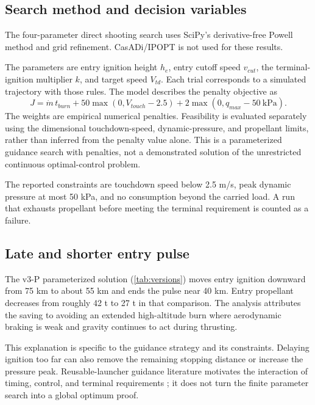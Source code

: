 \documentclass[11pt,a4paper]{article}
\begin{document}
\subsection{Search method and decision variables}
The four-parameter direct shooting search uses SciPy's derivative-free Powell method and grid refinement. CasADi/IPOPT is not used for these results.



The parameters are entry ignition height $h_e$, entry cutoff speed $v_{cut}$, the terminal-ignition multiplier $k$, and target speed $V_{td}$. Each trial corresponds to a simulated trajectory with those rules. The model describes the penalty objective as
\begin{equation}
 J=\dot m\,t_{burn}
 +50\max(0,V_{touch}-2.5)
 +2\max(0,q_{max}-50\ \mathrm{kPa}).
\label{eq:objective}
\end{equation}
The weights are empirical numerical penalties. Feasibility is evaluated separately using the dimensional touchdown-speed, dynamic-pressure, and propellant limits, rather than inferred from the penalty value alone. This is a parameterized guidance search with penalties, not a demonstrated solution of the unrestricted continuous optimal-control problem.

The reported constraints are touchdown speed below 2.5 m/s, peak dynamic pressure at most 50 kPa, and no consumption beyond the carried load. A run that exhausts propellant before meeting the terminal requirement is counted as a failure.

\subsection{Late and shorter entry pulse}


The v3-P parameterized solution (\cref{tab:versions}) moves entry ignition downward from 75 km to about 55 km and ends the pulse near 40 km. Entry propellant decreases from roughly 42 t to 27 t in that comparison. The analysis attributes the saving to avoiding an extended high-altitude burn where aerodynamic braking is weak and gravity continues to act during thrusting.

This explanation is specific to the guidance strategy and its constraints. Delaying ignition too far can also remove the remaining stopping distance or increase the pressure peak. Reusable-launcher guidance literature motivates the interaction of timing, control, and terminal requirements \cite{wilken,simplicio,botelho}; it does not turn the finite parameter search into a global optimum proof.
\end{document}
